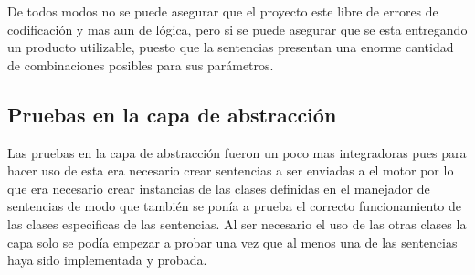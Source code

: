 De todos modos no se puede asegurar que el proyecto este libre de errores de codificación y mas aun de lógica, pero si se puede asegurar que se esta entregando un producto utilizable, puesto que la sentencias presentan una enorme cantidad de combinaciones posibles para sus parámetros.
%
\subsection{Pruebas en la capa de abstracción}
Las pruebas en la capa de abstracción fueron un poco mas integradoras pues para hacer uso de esta era necesario crear sentencias a ser enviadas a el motor por lo que era necesario crear instancias de las clases definidas en el manejador de sentencias de modo que también se ponía a prueba el correcto funcionamiento de las clases especificas de las sentencias. Al ser necesario el uso de las otras clases la capa solo se podía empezar a probar una vez que al menos una de las sentencias haya sido implementada y probada.
